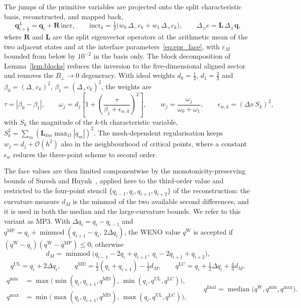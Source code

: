 \documentclass[a4paper,fleqn]{cas-sc}
\theoremstyle{remark}
\newcommand{\eps}{\varepsilon}
\newcommand{\epsM}{\eps_{M}}
\newcommand{\RR}{\mathbf{R}}
\newcommand{\LL}{\mathbf{L}}
\newcommand{\half}{\tfrac{1}{2}}
\DeclareMathOperator{\minmod}{minmod}
\DeclareMathOperator{\median}{median}
\begin{document}
The jumps of the primitive variables are projected onto the split characteristic
basis, reconstructed, and mapped back,
\begin{equation}
\label{eq:incr_proj}
\mathbf q^{L}_{i+\frac12}=\mathbf q_i+\RR\,\mathrm{incr},
\qquad
\mathrm{incr}_k=\half\big(w_0\,\Delta_-c_k+w_1\,\Delta_+c_k\big),
\qquad
\Delta_\pm c=\LL\,\Delta_\pm\mathbf q,
\end{equation}
where $\RR$ and $\LL$ are the split eigenvector operators at the arithmetic mean
of the two adjacent states and at the interface parameters~\eqref{eq:eps_face},
with $\epsM$ bounded from below by $10^{-2}$ in the basis only. The block
decomposition of Lemma~\ref{lem:blocks} reduces the inversion to the
five-dimensional aligned sector and removes the $B_\perp\to0$ degeneracy.
With ideal weights
$d_0=\tfrac13$, $d_1=\tfrac23$ and $\beta_0=(\Delta_-c_k)^2$,
$\beta_1=(\Delta_+c_k)^2$, the weights are
\begin{equation}
\label{eq:wenoz}
\tau=|\beta_0-\beta_1|,\qquad
\omega_j=d_j\!\left[1+\left(\frac{\tau}{\beta_j+\epsilon_{w,k}}\right)^{\!2}\right],\qquad
w_j=\frac{\omega_j}{\omega_0+\omega_1},
\qquad
\epsilon_{w,k}=(\Delta x\,S_k)^{2},
\end{equation}
with $S_k$ the magnitude of the $k$-th characteristic variable,
$S_k^{2}=\sum_m(\LL_{km}\max_\Omega|q_m|)^2$. The mesh-dependent regularisation
keeps $w_j=d_j+\mathcal O(h^2)$ also in the neighbourhood of critical points,
where a constant $\epsilon_w$ reduces the three-point scheme to second order.

The face values are then limited componentwise by the monotonicity-preserving
bounds of Suresh and Huynh~\cite{SureshHuynh1997}, applied here to the
third-order value and restricted to the four-point stencil
$\{q_{i-1},q_{i},q_{i+1},q_{i+2}\}$ of the reconstruction: the curvature measure $d_M$
is the minmod of the two available second differences, and it is used in both
the median and the large-curvature bounds. We refer to this variant as MP3. With
$\Delta q_i=q_i-q_{i-1}$ and
$q^{\mathrm{MP}}=q_i+\minmod(q_{i+1}-q_i,\,2\Delta q_i)$, the WENO value
$q^{\mathrm W}$ is accepted if
$(q^{\mathrm W}-q_i)(q^{\mathrm W}-q^{\mathrm{MP}})\le0$; otherwise
\begin{equation}
\label{eq:mp3_cand}
d_M=\minmod\!\big(q_{i-1}-2q_i+q_{i+1},\;q_i-2q_{i+1}+q_{i+2}\big),
\end{equation}
\begin{equation}
\label{eq:mp3_three}
q^{\mathrm{UL}}=q_i+2\Delta q_i,\qquad
q^{\mathrm{MD}}=\half(q_i+q_{i+1})-\half d_M,\qquad
q^{\mathrm{LC}}=q_i+\half\Delta q_i+\tfrac43 d_M,
\end{equation}
\begin{equation}
\label{eq:mp3_bounds}
\begin{aligned}
q^{\min}&=\max\!\big(\min(q_i,q_{i+1},q^{\mathrm{MD}}),\,\min(q_i,q^{\mathrm{UL}},q^{\mathrm{LC}})\big),\\
q^{\max}&=\min\!\big(\max(q_i,q_{i+1},q^{\mathrm{MD}}),\,\max(q_i,q^{\mathrm{UL}},q^{\mathrm{LC}})\big),
\end{aligned}
\qquad
q^{\mathrm{final}}=\median\!\big(q^{\mathrm W},q^{\min},q^{\max}\big).
\end{equation}
\end{document}
